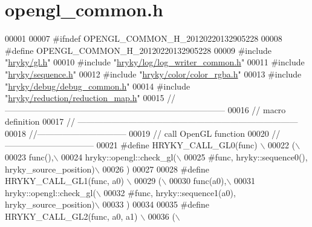 \hypertarget{opengl__common_8h_source}{\section{opengl\-\_\-common.\-h}
}

\begin{DoxyCode}
00001 
00007 \textcolor{preprocessor}{#ifndef OPENGL\_COMMON\_H\_20120220132905228}
00008 \textcolor{preprocessor}{}\textcolor{preprocessor}{#define OPENGL\_COMMON\_H\_20120220132905228}
00009 \textcolor{preprocessor}{}\textcolor{preprocessor}{#include "\hyperlink{gl_8h}{hryky/gl.h}"}
00010 \textcolor{preprocessor}{#include "\hyperlink{log__writer__common_8h}{hryky/log/log_writer_common.h}"}
00011 \textcolor{preprocessor}{#include "\hyperlink{sequence_8h}{hryky/sequence.h}"}
00012 \textcolor{preprocessor}{#include "\hyperlink{color__rgba_8h}{hryky/color/color_rgba.h}"}
00013 \textcolor{preprocessor}{#include "\hyperlink{debug__common_8h}{hryky/debug/debug_common.h}"}
00014 \textcolor{preprocessor}{#include "\hyperlink{reduction__map_8h}{hryky/reduction/reduction_map.h}"}
00015 \textcolor{comment}{//
      ------------------------------------------------------------------------------}
00016 \textcolor{comment}{// macro definition}
00017 \textcolor{comment}{//
      ------------------------------------------------------------------------------}
00018 \textcolor{comment}{//--------------------------------}
00019 \textcolor{comment}{// call OpenGL function}
00020 \textcolor{comment}{//--------------------------------}
00021 \textcolor{preprocessor}{#define HRYKY\_CALL\_GL0(func) \(\backslash\)}
00022 \textcolor{preprocessor}{    (\(\backslash\)}
00023 \textcolor{preprocessor}{     func(),\(\backslash\)}
00024 \textcolor{preprocessor}{     hryky::opengl::check\_gl(\(\backslash\)}
00025 \textcolor{preprocessor}{        #func, hryky::sequence0(), hryky\_source\_position)\(\backslash\)}
00026 \textcolor{preprocessor}{     )}
00027 \textcolor{preprocessor}{}
00028 \textcolor{preprocessor}{#define HRYKY\_CALL\_GL1(func, a0) \(\backslash\)}
00029 \textcolor{preprocessor}{    (\(\backslash\)}
00030 \textcolor{preprocessor}{     func(a0),\(\backslash\)}
00031 \textcolor{preprocessor}{     hryky::opengl::check\_gl(\(\backslash\)}
00032 \textcolor{preprocessor}{        #func, hryky::sequence1(a0), hryky\_source\_position)\(\backslash\)}
00033 \textcolor{preprocessor}{     )}
00034 \textcolor{preprocessor}{}
00035 \textcolor{preprocessor}{#define HRYKY\_CALL\_GL2(func, a0, a1) \(\backslash\)}
00036 \textcolor{preprocessor}{    (\(\backslash\)}

\end{DoxyCode}
